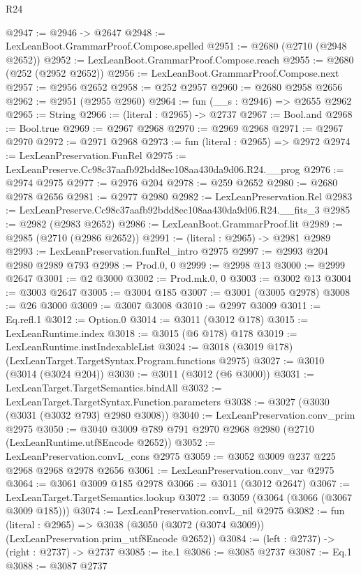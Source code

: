 \begin{lexlean}{R24}
\begin{coremodule}
@2947 := @2946 -> @2647
@2948 := LexLeanBoot.GrammarProof.Compose.spelled
@2951 := @2680 (@2710 (@2948 @2652))
@2952 := LexLeanBoot.GrammarProof.Compose.reach
@2955 := @2680 (@252 (@2952 @2652))
@2956 := LexLeanBoot.GrammarProof.Compose.next
@2957 := @2956 @2652
@2958 := @252 @2957
@2960 := @2680 @2958 @2656
@2962 := @2951 (@2955 @2960)
@2964 := fun (__s : @2946) => @2655 @2962
@2965 := String
@2966 := (literal : @2965) -> @2737
@2967 := Bool.and
@2968 := Bool.true
@2969 := @2967 @2968
@2970 := @2969 @2968
@2971 := @2967 @2970
@2972 := @2971 @2968
@2973 := fun (literal : @2965) => @2972
@2974 := LexLeanPreservation.FunRel
@2975 := LexLeanPreserve.Cc98c37aafb92bdd8ec108aa430da9d06.R24.__prog
@2976 := @2974 @2975
@2977 := @2976 @204
@2978 := @259 @2652
@2980 := @2680 @2978 @2656
@2981 := @2977 @2980
@2982 := LexLeanPreservation.Rel
@2983 := LexLeanPreserve.Cc98c37aafb92bdd8ec108aa430da9d06.R24.__fits_3
@2985 := @2982 (@2983 @2652)
@2986 := LexLeanBoot.GrammarProof.lit
@2989 := @2985 (@2710 (@2986 @2652))
@2991 := (literal : @2965) -> @2981 @2989
@2993 := LexLeanPreservation.funRel_intro @2975
@2997 := @2993 @204 @2980 @2989 @793
@2998 := Prod.{0, 0}
@2999 := @2998 @13
@3000 := @2999 @2647
@3001 := @2 @3000
@3002 := Prod.mk.{0, 0}
@3003 := @3002 @13
@3004 := @3003 @2647
@3005 := @3004 @185
@3007 := @3001 (@3005 @2978)
@3008 := @26 @3000
@3009 := @3007 @3008
@3010 := @2997 @3009
@3011 := Eq.refl.{1}
@3012 := Option.{0}
@3014 := @3011 (@3012 @178)
@3015 := LexLeanRuntime.index
@3018 := @3015 (@6 @178) @178
@3019 := LexLeanRuntime.instIndexableList
@3024 := @3018 (@3019 @178) (LexLeanTarget.TargetSyntax.Program.functions @2975)
@3027 := @3010 (@3014 (@3024 @204))
@3030 := @3011 (@3012 (@6 @3000))
@3031 := LexLeanTarget.TargetSemantics.bindAll
@3032 := LexLeanTarget.TargetSyntax.Function.parameters
@3038 := @3027 (@3030 (@3031 (@3032 @793) @2980 @3008))
@3040 := LexLeanPreservation.conv_prim @2975
@3050 := @3040 @3009 @789 @791 @2970 @2968 @2980 (@2710 (LexLeanRuntime.utf8Encode @2652))
@3052 := LexLeanPreservation.convL_cons @2975
@3059 := @3052 @3009 @237 @225 @2968 @2968 @2978 @2656
@3061 := LexLeanPreservation.conv_var @2975
@3064 := @3061 @3009 @185 @2978
@3066 := @3011 (@3012 @2647)
@3067 := LexLeanTarget.TargetSemantics.lookup
@3072 := @3059 (@3064 (@3066 (@3067 @3009 @185)))
@3074 := LexLeanPreservation.convL_nil @2975
@3082 := fun (literal : @2965) =>
  @3038 (@3050 (@3072 (@3074 @3009)) (LexLeanPreservation.prim_utf8Encode @2652))
@3084 := (left : @2737) -> (right : @2737) -> @2737
@3085 := ite.{1}
@3086 := @3085 @2737
@3087 := Eq.{1}
@3088 := @3087 @2737

\end{coremodule}
\end{lexlean}
